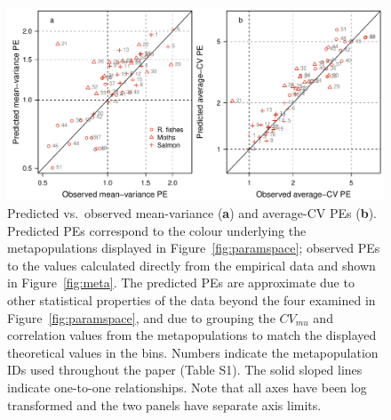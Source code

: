 \begin{figure}[htbp]
  \centering
  \includegraphics[width=\textwidth]{prophets/parameter-space-predicted-vs-observed-20120430.pdf}
  \caption{ Predicted vs.\ observed mean-variance (\textbf{a}) and average-CV
    PEs (\textbf{b}).  Predicted PEs correspond to the colour underlying the
    metapopulations displayed in Figure~\ref{fig:paramspace}; observed PEs to
    the values calculated directly from the empirical data and shown in
    Figure~\ref{fig:meta}. The predicted PEs are approximate due to other
    statistical properties of the data beyond the four examined in
    Figure~\ref{fig:paramspace}, and due to grouping the $CV_{mu}$ and
    correlation values from the metapopulations to match the displayed
    theoretical values in the bins.  Numbers indicate the metapopulation IDs
    used throughout the paper (Table S1).  The solid sloped lines indicate
    one-to-one relationships.  Note that all axes have been log transformed
    and the two panels have separate axis limits.  }
  \label{fig:PE-predicted-observed}
\end{figure}

